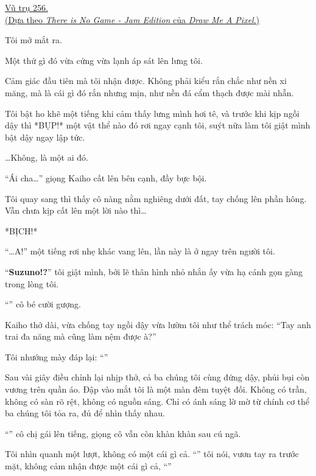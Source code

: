 \documentclass[../main.tex]{subfiles}
\begin{document}

\begin{center}
  \uline{Vũ trụ 256.\\(Dựa theo \textit{There is No Game - Jam Edition} của \textit{Draw Me A Pixel}.)}
\end{center}

Tôi mở mắt ra.

Một thứ gì đó vừa cứng vừa lạnh áp sát lên lưng tôi.

Cảm giác đầu tiên mà tôi nhận được. Không phải kiểu rắn chắc như nền xi măng, mà là cái gì đó rắn nhưng mịn, như nền đá cẩm thạch được mài nhẵn.

Tôi bật ho khẽ một tiếng khi cảm thấy lưng mình hơi tê, và trước khi kịp ngồi dậy thì *BỤP!* một vật thể nào đó rơi ngay cạnh tôi, suýt nữa làm tôi giật mình bật dậy ngay lập tức.

\dots Không, là một ai đó.

``Ái cha\dots'' giọng Kaiho cất lên bên cạnh, đầy bực bội.

Tôi quay sang thì thấy cô nàng nằm nghiêng dưới đất, tay chống lên phần hông. Vẫn chưa kịp cất lên một lời nào thì\dots

*BỊCH!*

``\dots A!'' một tiếng rơi nhẹ khác vang lên, lần này là ở ngay trên người tôi.

``\textbf{Suzuno!?}'' tôi giật mình, bởi lẽ thân hình nhỏ nhắn ấy vừa hạ cánh gọn gàng trong lòng tôi.

``'' cô bé cười gượng.

Kaiho thở dài, vừa chống tay ngồi dậy vừa lườm tôi như thể trách móc: ``Tay anh trai đa năng mà cũng làm nệm được à?''

Tôi nhướng mày đáp lại: ``''

Sau vài giây điều chỉnh lại nhịp thở, cả ba chúng tôi cùng đứng dậy, phủi bụi còn vương trên quần áo. Đập vào mắt tôi là một màn đêm tuyệt đối. Không có trần, không có sàn rõ rệt, không có nguồn sáng. Chỉ có ánh sáng lờ mờ từ chính cơ thể ba chúng tôi tỏa ra, đủ để nhìn thấy nhau.

``'' cô chị gái lên tiếng, giọng cô vẫn còn khàn khàn sau cú ngã.

Tôi nhìn quanh một lượt, không có một cái gì cả. ``'' tôi nói, vươn tay ra trước mặt, không cảm nhận được một cái gì cả, ``''
\end{document}
